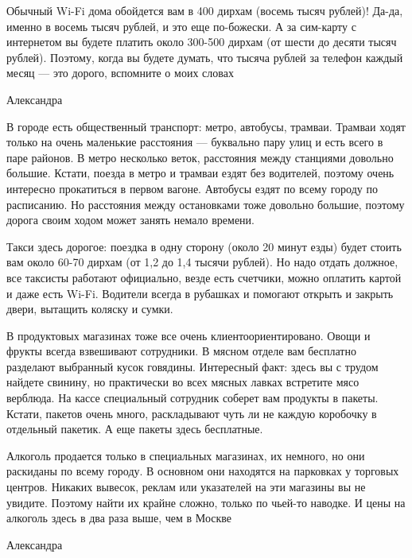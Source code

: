 \begin{fancyquotes}
    Обычный Wi-Fi дома обойдется вам в 400 дирхам (восемь тысяч рублей)! Да-да, именно в восемь тысяч рублей, и это еще по-божески. А за сим-карту с интернетом вы будете платить около 300-500 дирхам (от шести до десяти тысяч рублей). Поэтому, когда вы будете думать, что тысяча рублей за телефон каждый месяц — это дорого, вспомните о моих словах

    \begin{flushright}
        Александра
    \end{flushright}
\end{fancyquotes}

В городе есть общественный транспорт: метро, автобусы, трамваи. Трамваи ходят только на очень маленькие расстояния — буквально пару улиц и есть всего в паре районов. В метро несколько веток, расстояния между станциями довольно большие. Кстати, поезда в метро и трамваи ездят без водителей, поэтому очень интересно прокатиться в первом вагоне. Автобусы ездят по всему городу по расписанию. Но расстояния между остановками тоже довольно большие, поэтому дорога своим ходом может занять немало времени.

Такси здесь дорогое: поездка в одну сторону (около 20 минут езды) будет стоить вам около 60-70 дирхам (от 1,2 до 1,4 тысячи рублей). Но надо отдать должное, все таксисты работают официально, везде есть счетчики, можно оплатить картой и даже есть Wi-Fi. Водители всегда в рубашках и помогают открыть и закрыть двери, вытащить коляску и сумки.

В продуктовых магазинах тоже все очень клиентоориентировано. Овощи и фрукты всегда взвешивают сотрудники. В мясном отделе вам бесплатно разделают выбранный кусок говядины. Интересный факт: здесь вы с трудом найдете свинину, но практически во всех мясных лавках встретите мясо верблюда. На кассе специальный сотрудник соберет вам продукты в пакеты. Кстати, пакетов очень много, раскладывают чуть ли не каждую коробочку в отдельный пакетик. А еще пакеты здесь бесплатные.

\begin{fancyquotes}
    Алкоголь продается только в специальных магазинах, их немного, но они раскиданы по всему городу. В основном они находятся на парковках у торговых центров. Никаких вывесок, реклам или указателей на эти магазины вы не увидите. Поэтому найти их крайне сложно, только по чьей-то наводке. И цены на алкоголь здесь в два раза выше, чем в Москве

    \begin{flushright}
        Александра
    \end{flushright}
\end{fancyquotes}


